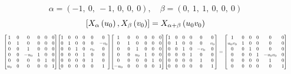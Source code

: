 \documentclass[11pt]{article}
\theoremstyle{definition}
\begin{document}
\[
\alpha = \left( -1, \  0, \  -1, \  0, \  0, \  0\right), \quad \beta = \left( 0, \  1, \  1, \  0, \  0, \  0\right)
\]
\[
\scaletoalign{\textwidth}{\left[ X_{\alpha}\left(u_{0}\right), X_{\beta}\left(v_{0}\right) \right] = X_{\alpha + \beta}\left(u_{0} v_{0}\right)}
\]
\[
\scaletoalign{\textwidth}{{\left[\begin{matrix}1 & 0 & 0 & 0 & 0 & 0\\0 & 1 & 0 & 0 & 0 & 0\\0 & 0 & 1 & 0 & 0 & 0\\0 & 0 & - u_{0} & 1 & 0 & 0\\0 & 0 & 0 & 0 & 1 & 0\\u_{0} & 0 & 0 & 0 & 0 & 1\end{matrix}\right]} {\left[\begin{matrix}1 & 0 & 0 & 0 & 0 & 0\\0 & 1 & 0 & 0 & 0 & - v_{0}\\0 & 0 & 1 & 0 & v_{0} & 0\\0 & 0 & 0 & 1 & 0 & 0\\0 & 0 & 0 & 0 & 1 & 0\\0 & 0 & 0 & 0 & 0 & 1\end{matrix}\right]} {\left[\begin{matrix}1 & 0 & 0 & 0 & 0 & 0\\0 & 1 & 0 & 0 & 0 & 0\\0 & 0 & 1 & 0 & 0 & 0\\0 & 0 & u_{0} & 1 & 0 & 0\\0 & 0 & 0 & 0 & 1 & 0\\- u_{0} & 0 & 0 & 0 & 0 & 1\end{matrix}\right]} {\left[\begin{matrix}1 & 0 & 0 & 0 & 0 & 0\\0 & 1 & 0 & 0 & 0 & v_{0}\\0 & 0 & 1 & 0 & - v_{0} & 0\\0 & 0 & 0 & 1 & 0 & 0\\0 & 0 & 0 & 0 & 1 & 0\\0 & 0 & 0 & 0 & 0 & 1\end{matrix}\right]} = {\left[\begin{matrix}1 & 0 & 0 & 0 & 0 & 0\\u_{0} v_{0} & 1 & 0 & 0 & 0 & 0\\0 & 0 & 1 & 0 & 0 & 0\\0 & 0 & 0 & 1 & - u_{0} v_{0} & 0\\0 & 0 & 0 & 0 & 1 & 0\\0 & 0 & 0 & 0 & 0 & 1\end{matrix}\right]}}
\]
\end{document}
